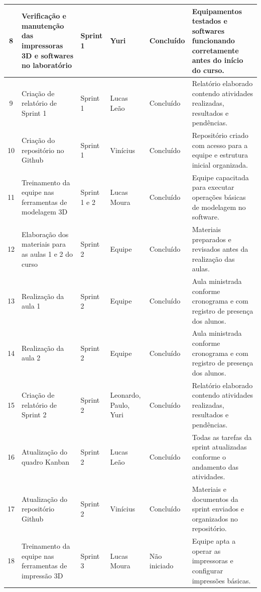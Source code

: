 \documentclass[12pt,a4paper]{article}
\begin{document}
\begin{longtable}{|c|p{3.8cm}|p{1.9cm}|p{2.2cm}|p{1.7cm}|p{4.2cm}|}
8 & Verificação e manutenção das impressoras 3D e softwares no laboratório & Sprint 1 & Yuri & Concluído & Equipamentos testados e softwares funcionando corretamente antes do início do curso. \\ \hline

9 & Criação de relatório de Sprint 1 & Sprint 1 & Lucas Leão & Concluído & Relatório elaborado contendo atividades realizadas, resultados e pendências. \\ \hline

10 & Criação do repositório no Github & Sprint 1 & Vinícius & Concluído & Repositório criado com acesso para a equipe e estrutura inicial organizada. \\ \hline

11 & Treinamento da equipe nas ferramentas de modelagem 3D & Sprint 1 e 2 & Lucas Moura & Concluído & Equipe capacitada para executar operações básicas de modelagem no software. \\ \hline

12 & Elaboração dos materiais para as aulas 1 e 2 do curso & Sprint 2 & Equipe & Concluído & Materiais preparados e revisados antes da realização das aulas. \\ \hline

13 & Realização da aula 1 & Sprint 2 & Equipe & Concluído & Aula ministrada conforme cronograma e com registro de presença dos alunos. \\ \hline

14 & Realização da aula 2 & Sprint 2 & Equipe & Concluído & Aula ministrada conforme cronograma e com registro de presença dos alunos. \\ \hline

15 & Criação de relatório de Sprint 2 & Sprint 2 & Leonardo, Paulo, Yuri & Concluído & Relatório elaborado contendo atividades realizadas, resultados e pendências. \\ \hline

16 & Atualização do quadro Kanban & Sprint 2 & Lucas Leão & Concluído & Todas as tarefas da sprint atualizadas conforme o andamento das atividades. \\ \hline

17 & Atualização do repositório Github & Sprint 2 & Vinícius & Concluído & Materiais e documentos da sprint enviados e organizados no repositório. \\ \hline

18 & Treinamento da equipe nas ferramentas de impressão 3D & Sprint 3 & Lucas Moura & Não iniciado & Equipe apta a operar as impressoras e configurar impressões básicas. \\ \hline


\end{longtable}
\end{document}

